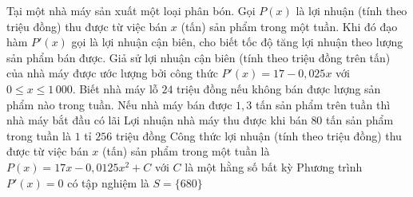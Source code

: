 \begin{ex}%
	Tại một nhà máy sản xuất một loại phân bón. Gọi $P(x)$ là lợi nhuận (tính theo triệu đồng) thu được từ việc bán $x$ (tấn) sản phẩm trong một tuần. Khi đó đạo hàm $P'(x)$ gọi là lợi nhuận cận biên, cho biết tốc độ tăng lợi nhuận theo lượng sản phẩm bán được. Giả sử lợi nhuận cận biên (tính theo triệu đồng trên tấn) của nhà máy được ước lượng bởi công thức $P'(x)=17-0{,}025x$ với $0 \le x \le 1\,000$. Biết nhà máy lỗ $24$ triệu đồng nếu không bán được lượng sản phẩm nào trong tuần.
	\choiceTF
	{Nếu nhà máy bán được $1{,}3$ tấn sản phẩm trên tuần thì nhà máy bắt đầu có lãi}
	{\True Lợi nhuận nhà máy thu được khi bán $80$ tấn sản phẩm trong tuần là $1$ tỉ $256$ triệu đồng}
	{Công thức lợi nhuận (tính theo triệu đồng) thu được từ việc bán $x$ (tấn) sản phẩm trong một tuần là $P(x)=17x-0{,}0125x^2+C$ với $C$ là một hằng số bất kỳ}
	{\True Phương trình $P'(x)=0$ có tập nghiệm là $S=\{680\}$}
\end{ex}

